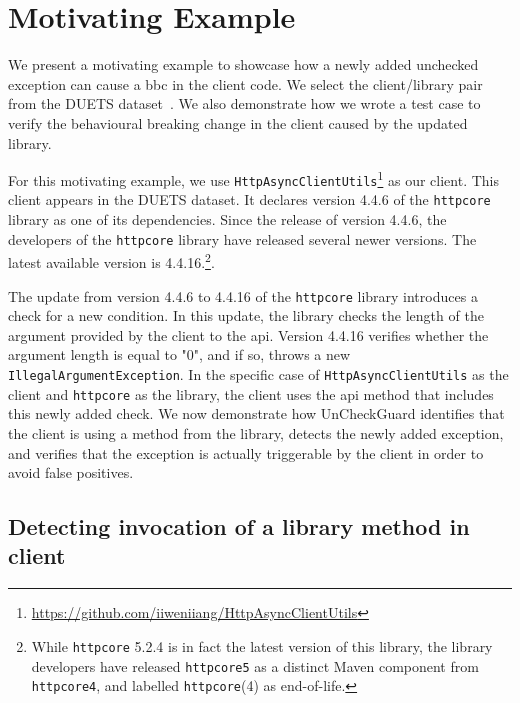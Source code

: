 \chapter{Motivating Example}\label{example}

We present a motivating example to showcase how a newly added unchecked exception can cause a \gls{bbc} in the client code. We select the client/library pair from the DUETS dataset~\cite{durieux21:_duets}. We also demonstrate how we wrote a test case to verify the behavioural breaking change in the client caused by the updated library.

For this motivating example, we use \texttt{HttpAsyncClientUtils}\footnote{\url{https://github.com/iiweniiang/HttpAsyncClientUtils}} as our client. This client appears in the DUETS dataset. It declares version 4.4.6 of the \texttt{httpcore} library as one of its dependencies. Since the release of version 4.4.6, the developers of the \texttt{httpcore} library have released several newer versions. The latest available version is 4.4.16.\footnote{While \texttt{httpcore} 5.2.4 is in fact the latest version of this library, the library developers have released \texttt{httpcore5} as a distinct Maven component from \texttt{httpcore4}, and labelled \texttt{httpcore}(4) as end-of-life.}.

The update from version 4.4.6 to 4.4.16 of the \texttt{httpcore} library introduces a check for a new condition. In this update, the library checks the length of the argument provided by the client to the \gls{api}. Version 4.4.16 verifies whether the argument length is equal to "0", and if so, throws a new \texttt{IllegalArgumentException}. In the specific case of \texttt{HttpAsyncClientUtils} as the client and \texttt{httpcore} as the library, the client uses the \gls{api} method that includes this newly added check. We now demonstrate how UnCheckGuard identifies that the client is using a method from the library, detects the newly added exception, and verifies that the exception is actually triggerable by the client in order to avoid false positives.

\section{Detecting invocation of a library method in client}

